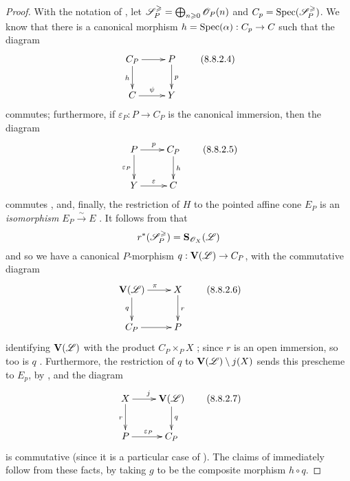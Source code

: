 \begin{proof}
With the notation of , let $\mathscr{S}_P^\geqslant = \bigoplus_{n\geqslant0}\mathscr{O}_P(n)$ and $C_p=\operatorname{Spec}(\mathscr{S}_P^\geqslant)$.
We know  that there is a canonical morphism $h=\Spec(\alpha):C_p\to C$ such that the diagram
\[
\label{II.8.8.2.4}
  \xymatrix{
    C_P
      \ar[r]
      \ar[d]_{h}
  & P
      \ar[d]^{p}
  \\C
      \ar[r]^{\psi}
  & Y
  }
\tag{8.8.2.4}
\]
commutes; furthermore, if $\varepsilon_P:P\to C_P$ is the canonical immersion, then the diagram
\[
\label{II.8.8.2.5}
  \xymatrix{
    P
      \ar[r]^{p}
      \ar[d]_{\varepsilon_P}
  & C_P
      \ar[d]^{h}
  \\Y
      \ar[r]^{\varepsilon}
  & C
  }
\tag{8.8.2.5}
\]
commutes , and, finally, the restriction of $H$ to the pointed affine cone $E_P$ is an \emph{isomorphism} $E_P\xrightarrow{\sim}E$ .
It follows from  that
\[
  r^*(\mathscr{S}_P^\geqslant)=\mathbf{S}_{\mathscr{O}_X}(\mathscr{L})
\]
and so we have a canonical $P$-morphism $q:\bb{V}(\sh{L})\to C_P$, with the commutative diagram
\[
\label{II.8.8.2.6}
  \xymatrix{
    \bb{V}(\sh{L})
      \ar[r]^{\pi}
      \ar[d]_{q}
  & X
      \ar[d]^{r}
  \\C_P
      \ar[r]
  & P
  }
\tag{8.8.2.6}
\]
identifying $\mathbf{V}(\mathscr{L})$ with the product $C_P\times_P X$ ;
since $r$ is an open immersion, so too is $q$ .
Furthermore, the restriction of $q$ to $\mathbf{V}(\mathscr{L})\setminus j(X)$ sends this prescheme to $E_p$, by , and the diagram
\[
\label{II.8.8.2.7}
  \xymatrix{
    X
      \ar[r]^{j}
      \ar[d]_{r}
  & \bb{V}(\sh{L})
      \ar[d]^{q}
  \\P
      \ar[r]^{\varepsilon_P}
  & C_P
  }
\tag{8.8.2.7}
\]
is commutative (since it is a particular case of ).
The claims of  immediately follow from these facts, by taking $g$ to be the composite morphism $h\circ q$.
\end{proof}

